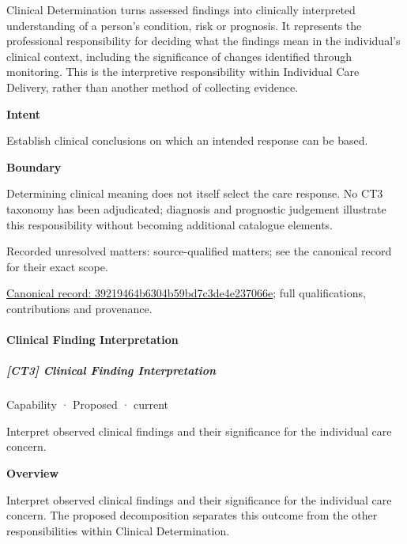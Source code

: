 Clinical Determination turns assessed findings into clinically interpreted understanding of a person's condition, risk or prognosis. It represents the professional responsibility for deciding what the findings mean in the individual's clinical context, including the significance of changes identified through monitoring. This is the interpretive responsibility within Individual Care Delivery, rather than another method of collecting evidence.



\textbf{Intent}



Establish clinical conclusions on which an intended response can be based.



\textbf{Boundary}



Determining clinical meaning does not itself select the care response. No CT3 taxonomy has been adjudicated; diagnosis and prognostic judgement illustrate this responsibility without becoming additional catalogue elements.


{\small Recorded unresolved matters: source-qualified matters; see the canonical record for their exact scope.}\par
{\footnotesize \href{../../../../continuum/strategy/capability/39219464b6304b59bd7c3de4e237066e.md}{Canonical record: 39219464b6304b59bd7c3de4e237066e}; full qualifications, contributions and provenance.}\par
\paragraph{Clinical Finding Interpretation}

\subparagraph{[CT3] Clinical Finding Interpretation}

\label{element:deb78ba3b1514074a8ca5bc5da0673f5}
{\small Capability · Proposed · current}\par

Interpret observed clinical findings and their significance for the individual care concern.



\textbf{Overview}



Interpret observed clinical findings and their significance for the individual care concern. The proposed decomposition separates this outcome from the other responsibilities within Clinical Determination.



